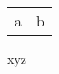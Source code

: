 \documentclass[ngerman]{letter}
\begin{document}
\begin{tabular}{l l}
a &  b
\end{tabular}
xyz
\end{document}
